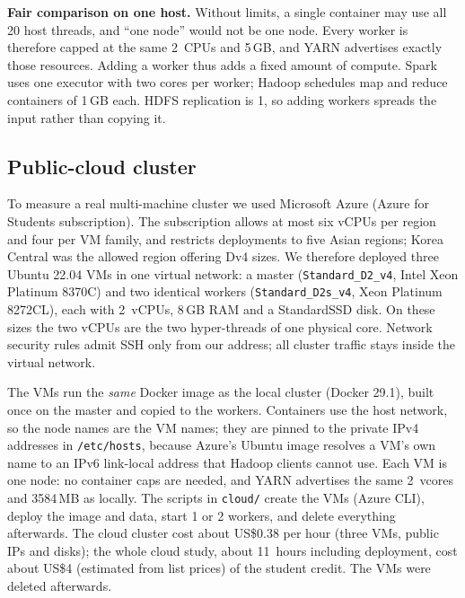 \textbf{Fair comparison on one host.} Without limits, a single container may use all
20 host threads, and ``one node'' would not be one node. Every worker is therefore
capped at the same 2~CPUs and 5\,GB, and YARN advertises exactly those resources.
Adding a worker thus adds a fixed amount of compute. Spark uses one executor with two
cores per worker; Hadoop schedules map and reduce containers of 1\,GB each. HDFS
replication is 1, so adding workers spreads the input rather than copying it.

\subsection{Public-cloud cluster}
To measure a real multi-machine cluster we used Microsoft Azure (Azure for Students
subscription). The subscription allows at most six vCPUs per region and four per VM
family, and restricts deployments to five Asian regions; Korea Central was the
allowed region offering Dv4 sizes. We therefore deployed three Ubuntu 22.04 VMs in one
virtual network: a master (\texttt{Standard\_D2\_v4}, Intel Xeon Platinum 8370C) and
two identical workers (\texttt{Standard\_D2s\_v4}, Xeon Platinum 8272CL), each with
2~vCPUs, 8\,GB RAM and a StandardSSD disk. On these sizes the two vCPUs are the two
hyper-threads of one physical core. Network security rules admit SSH only from our
address; all cluster traffic stays inside the virtual network.

The VMs run the \emph{same} Docker image as the local cluster (Docker 29.1), built
once on the master and copied to the workers. Containers use the host network, so the
node names are the VM names; they are pinned to the private IPv4 addresses in
\texttt{/etc/hosts}, because Azure's Ubuntu image resolves a VM's own name to an IPv6
link-local address that Hadoop clients cannot use. Each VM is one node: no container
caps are needed, and YARN advertises the same 2~vcores and 3584\,MB as locally. The
scripts in \texttt{cloud/} create the VMs (Azure CLI), deploy the image and data,
start 1 or 2 workers, and delete everything afterwards. The cloud cluster cost about
US\$0.38 per hour (three VMs, public IPs and disks); the whole cloud study, about
11~hours including deployment, cost about US\$4 (estimated from list prices) of the
student credit. The VMs were deleted afterwards.

